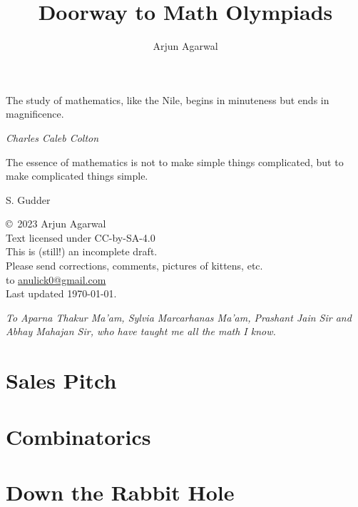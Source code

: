 \documentclass{maaprb}
\title{Doorway to Math Olympiads}
\author{Arjun Agarwal}
\begin{document}
\frontmatter
\maketitle
\epigraph{The study of mathematics, like the Nile, begins in minuteness but ends in magnificence.}{\textit{Charles Caleb Colton}}
\epigraph{The essence of mathematics is not to make simple things complicated, but to make complicated things simple.}{S. Gudder}
\pagebreak

\begin{center}
\copyright\ 2023 Arjun Agarwal \\
Text licensed under CC-by-SA-4.0 \\
This is (still!) an incomplete draft. \\
Please send corrections, comments, pictures of kittens, etc. \\
to \href{mailto:anulick0@gmail.com}{anulick0@gmail.com} \\
Last updated \today.
\end{center}
\pagebreak

\thispagestyle{empty}
\vspace*{13.5pc}
\begin{center}
{\em To Aparna Thakur Ma'am, Sylvia Marcarhanas Ma'am, Prashant Jain Sir and Abhay Mahajan Sir, who have taught me all the math I know.} 
\end{center}
\pagebreak


\tableofcontents





\mainmatter
\part{Sales Pitch}


\part{Combinatorics}






\part{Down the Rabbit Hole}




\end{document}
